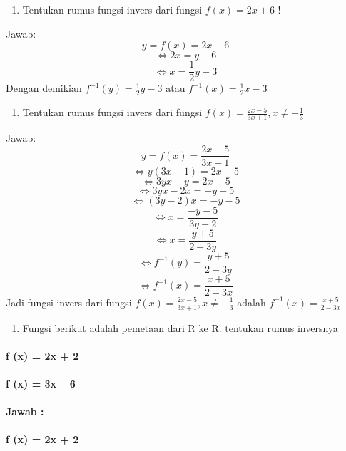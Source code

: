 \documentclass[11pt,fleqn]{book} %
\begin{document}
\begin{enumerate}
\item  Tentukan rumus fungsi invers dari fungsi $f(x)=2x+6$ !
\end{enumerate}

\noindent         Jawab:
\[y=f(x)=2x+6\] 
\[\Leftrightarrow 2x=y-6\] 
\[\Leftrightarrow x=\frac{1}{2} y-3\] 
Dengan demikian $f^{-1} (y)=\frac{1}{2} y-3$ atau $f^{-1} (x)=\frac{1}{2} x-3$

\noindent 

\begin{enumerate}
\item  Tentukan rumus fungsi invers dari fungsi $f(x)=\frac{2x-5}{3x+1} ,x\ne -\frac{1}{3} $
\end{enumerate}

\noindent        Jawab:
\[y=f(x)=\frac{2x-5}{3x+1} \] 
\[\Leftrightarrow y(3x+1)=2x-5\] 
\[\Leftrightarrow 3yx+y=2x-5\] 
\[\Leftrightarrow 3yx-2x=-y-5\] 
\[\Leftrightarrow (3y-2)x=-y-5\] 
\[\Leftrightarrow x=\frac{-y-5}{3y-2} \] 
\[\Leftrightarrow x=\frac{y+5}{2-3y} \] 
\[\Leftrightarrow f^{-1} (y)=\frac{y+5}{2-3y} \] 
\[\Leftrightarrow f^{-1} (x)=\frac{x+5}{2-3x} \] 
Jadi fungsi invers dari fungsi $f(x)=\frac{2x-5}{3x+1} ,x\ne -\frac{1}{3} $ adalah $f^{-1} (x)=\frac{x+5}{2-3x} $

\noindent 

\begin{enumerate}
\item  Fungsi berikut adalah pemetaan dari R ke R. tentukan rumus inversnya
\end{enumerate}


\paragraph{ f (x) = 2x + 2}


\paragraph{ f (x) = 3x -- 6}

\noindent 
\paragraph{Jawab :}


\paragraph{ f (x) = 2x + 2}

\noindent 
\end{document}
